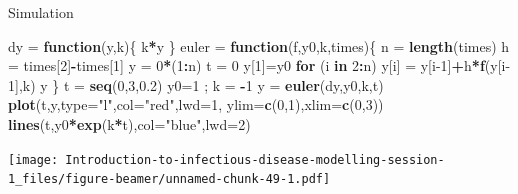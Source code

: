 \documentclass[
  ignorenonframetext,
]{beamer}
\newenvironment{Shaded}{\begin{snugshade}}{\end{snugshade}}
\newcommand{\AttributeTok}[1]{\textcolor[rgb]{0.13,0.29,0.53}{#1}}
\newcommand{\ControlFlowTok}[1]{\textcolor[rgb]{0.13,0.29,0.53}{\textbf{#1}}}
\newcommand{\DecValTok}[1]{\textcolor[rgb]{0.00,0.00,0.81}{#1}}
\newcommand{\FloatTok}[1]{\textcolor[rgb]{0.00,0.00,0.81}{#1}}
\newcommand{\FunctionTok}[1]{\textcolor[rgb]{0.13,0.29,0.53}{\textbf{#1}}}
\newcommand{\NormalTok}[1]{#1}
\newcommand{\OtherTok}[1]{\textcolor[rgb]{0.56,0.35,0.01}{#1}}
\newcommand{\SpecialCharTok}[1]{\textcolor[rgb]{0.81,0.36,0.00}{\textbf{#1}}}
\newcommand{\StringTok}[1]{\textcolor[rgb]{0.31,0.60,0.02}{#1}}
\begin{document}
\begin{frame}[fragile]{Simulation}
\begin{Shaded}
\begin{Highlighting}[]
\NormalTok{dy }\OtherTok{=} \ControlFlowTok{function}\NormalTok{(y,k)\{}
\NormalTok{  k}\SpecialCharTok{*}\NormalTok{y}
\NormalTok{\}}
\NormalTok{euler }\OtherTok{=} \ControlFlowTok{function}\NormalTok{(f,y0,k,times)\{}
\NormalTok{  n }\OtherTok{=} \FunctionTok{length}\NormalTok{(times)}
\NormalTok{  h }\OtherTok{=}\NormalTok{ times[}\DecValTok{2}\NormalTok{]}\SpecialCharTok{{-}}\NormalTok{times[}\DecValTok{1}\NormalTok{]}
\NormalTok{  y }\OtherTok{=} \DecValTok{0}\SpecialCharTok{*}\NormalTok{(}\DecValTok{1}\SpecialCharTok{:}\NormalTok{n)}
\NormalTok{  t }\OtherTok{=} \DecValTok{0} 
\NormalTok{  y[}\DecValTok{1}\NormalTok{]}\OtherTok{=}\NormalTok{y0}
  \ControlFlowTok{for}\NormalTok{ (i }\ControlFlowTok{in} \DecValTok{2}\SpecialCharTok{:}\NormalTok{n)}
\NormalTok{    y[i] }\OtherTok{=}\NormalTok{ y[i}\DecValTok{{-}1}\NormalTok{]}\SpecialCharTok{+}\NormalTok{h}\SpecialCharTok{*}\FunctionTok{f}\NormalTok{(y[i}\DecValTok{{-}1}\NormalTok{],k) }
\NormalTok{  y}
\NormalTok{\}}
\NormalTok{t }\OtherTok{=} \FunctionTok{seq}\NormalTok{(}\DecValTok{0}\NormalTok{,}\DecValTok{3}\NormalTok{,}\FloatTok{0.2}\NormalTok{)}
\NormalTok{y0}\OtherTok{=}\DecValTok{1}\NormalTok{ ; k }\OtherTok{=} \SpecialCharTok{{-}}\DecValTok{1}
\NormalTok{y }\OtherTok{=} \FunctionTok{euler}\NormalTok{(dy,y0,k,t)}
\FunctionTok{plot}\NormalTok{(t,y,}\AttributeTok{type=}\StringTok{"l"}\NormalTok{,}\AttributeTok{col=}\StringTok{"red"}\NormalTok{,}\AttributeTok{lwd=}\DecValTok{1}\NormalTok{, }\AttributeTok{ylim=}\FunctionTok{c}\NormalTok{(}\DecValTok{0}\NormalTok{,}\DecValTok{1}\NormalTok{),}\AttributeTok{xlim=}\FunctionTok{c}\NormalTok{(}\DecValTok{0}\NormalTok{,}\DecValTok{3}\NormalTok{))}
\FunctionTok{lines}\NormalTok{(t,y0}\SpecialCharTok{*}\FunctionTok{exp}\NormalTok{(k}\SpecialCharTok{*}\NormalTok{t),}\AttributeTok{col=}\StringTok{"blue"}\NormalTok{,}\AttributeTok{lwd=}\DecValTok{2}\NormalTok{)}
\end{Highlighting}
\end{Shaded}

\texttt{[image: Introduction-to-infectious-disease-modelling-session-1\_files/figure-beamer/unnamed-chunk-49-1.pdf]}
\end{frame}
\end{document}
